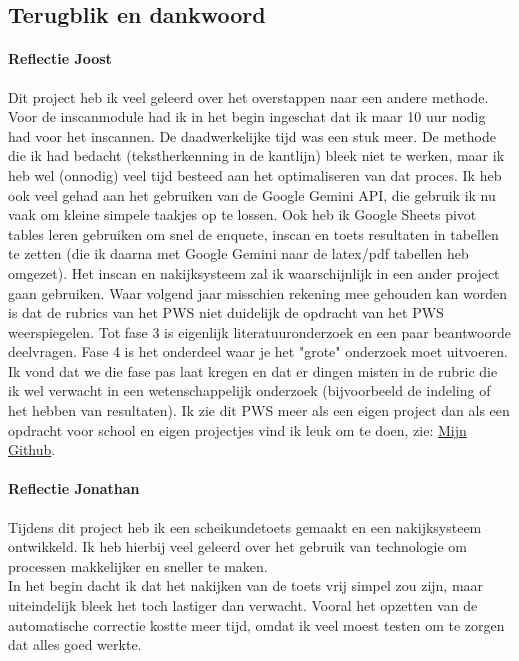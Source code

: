 \documentclass[12pt]{article}
\begin{document}
\subsection{Terugblik en dankwoord}
\begin{multicols}{2}
\noindent\begin{minipage}{\linewidth}
    
\paragraph*{Reflectie Joost} Dit project heb ik veel geleerd over het overstappen naar een andere methode. Voor de inscanmodule had ik in het begin ingeschat dat ik maar 10 uur nodig had voor het inscannen. De daadwerkelijke tijd was een stuk meer. De methode die ik had bedacht (tekstherkenning in de kantlijn) bleek niet te werken, maar ik heb wel (onnodig) veel tijd besteed aan het optimaliseren van dat proces. Ik heb ook veel gehad aan het gebruiken van de Google Gemini API, die gebruik ik nu vaak om kleine simpele taakjes op te lossen. Ook heb ik Google Sheets pivot tables leren gebruiken om snel de enquete, inscan en toets resultaten in tabellen te zetten (die ik daarna met Google Gemini naar de latex/pdf tabellen heb omgezet). Het inscan en nakijksysteem zal ik waarschijnlijk in een ander project gaan gebruiken. Waar volgend jaar misschien rekening mee gehouden kan worden is dat de rubrics van het PWS niet duidelijk de opdracht van het PWS weerspiegelen. Tot fase 3 is eigenlijk literatuuronderzoek en een paar beantwoorde deelvragen. Fase 4 is het onderdeel waar je het "grote" onderzoek moet uitvoeren. Ik vond dat we die fase pas laat kregen en dat er dingen misten in de rubric die ik wel verwacht in een wetenschappelijk onderzoek (bijvoorbeeld de indeling of het hebben van resultaten). Ik zie dit PWS meer als een eigen project dan als een opdracht voor school en eigen projectjes vind ik leuk om te doen, zie: \href{https://github.com/TanteJossa}{Mijn Github}.  
\end{minipage}
\begin{minipage}{\linewidth}
\paragraph*{Reflectie Jonathan} Tijdens dit project heb ik een scheikundetoets gemaakt en een nakijksysteem ontwikkeld. 
Ik heb hierbij veel geleerd over het gebruik van technologie om processen makkelijker en sneller te maken. \\
In het begin dacht ik dat het nakijken van de toets vrij simpel zou zijn, maar uiteindelijk bleek het toch lastiger dan verwacht. 
Vooral het opzetten van de automatische correctie kostte meer tijd, omdat ik veel moest testen om te zorgen dat alles goed werkte.\\


\end{minipage}
\end{multicols}
\end{document}
